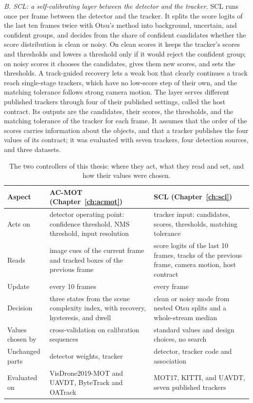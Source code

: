 \emph{B. SCL: a self-calibrating layer between the detector and the tracker.} SCL runs once per frame between the detector and the tracker. It splits the score logits of the last ten frames twice with Otsu's method \cite{goh2018otsu} into background, uncertain, and confident groups, and decides from the share of confident candidates whether the score distribution is clean or noisy. On clean scores it keeps the tracker's scores and thresholds and lowers a threshold only if it would reject the confident group; on noisy scores it chooses the candidates, gives them new scores, and sets the thresholds. A track-guided recovery lets a weak box that clearly continues a track reach single-stage trackers, which have no low-score step of their own, and the matching tolerance follows strong camera motion. The layer serves different published trackers through four of their published settings, called the host contract. Its outputs are the candidates, their scores, the thresholds, and the matching tolerance of the tracker for each frame. It assumes that the order of the scores carries information about the objects, and that a tracker publishes the four values of its contract; it was evaluated with seven trackers, four detection sources, and three datasets.

\begin{table}[tbp]
\centering
\caption{The two controllers of this thesis: where they act, what they read and set, and how their values were chosen.}
\label{tab:intro-controllers}
\begin{tabular}{>{\raggedright\arraybackslash}p{2.9cm}>{\raggedright\arraybackslash}p{5.5cm}>{\raggedright\arraybackslash}p{5.5cm}}
\toprule
Aspect & AC-MOT (Chapter~\ref{ch:acmot}) & SCL (Chapter~\ref{ch:scl})\\
\midrule
Acts on & detector operating point: confidence threshold, NMS threshold, input resolution & tracker input: candidates, scores, thresholds, matching tolerance\\
Reads & image cues of the current frame and tracked boxes of the previous frame & score logits of the last 10 frames, tracks of the previous frame, camera motion, host contract\\
Update & every 10 frames & every frame\\
Decision & three states from the scene complexity index, with recovery, hysteresis, and dwell & clean or noisy mode from nested Otsu splits and a whole-stream median\\
Values chosen by & cross-validation on calibration sequences & standard values and design choices, no search\\
Unchanged parts & detector weights, tracker & detector, tracker code and association\\
Evaluated on & VisDrone2019-MOT and UAVDT, ByteTrack and OATrack & MOT17, KITTI, and UAVDT, seven published trackers\\
\bottomrule
\end{tabular}
\end{table}

